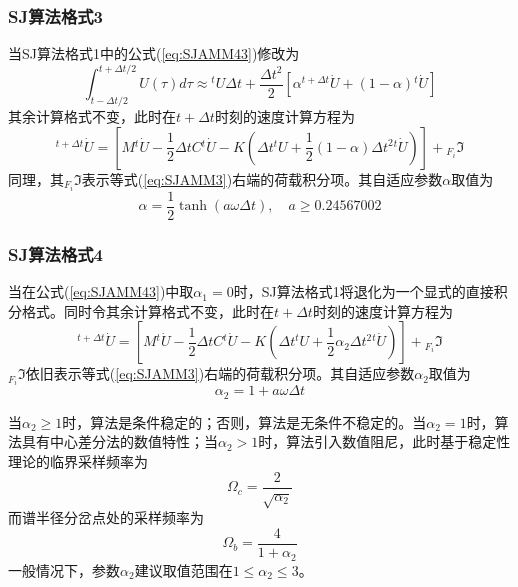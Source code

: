 \subsubsection{SJ算法格式3\cite{SoaresJr2015b}}
当SJ算法格式1\cite{SoaresJr2015c}中的公式(\ref{eq:SJAMM43})修改为
\begin{equation}
\int_{t-\Delta t/2}^{t+\Delta t/2}{U}(\tau)d\tau\approx{^t\!U}\Delta t+\frac{\Delta t^2}{2}[\alpha{^{t+\Delta t}\!\dot{U}}+(1-\alpha){^{t}\!\dot{U}}]
\end{equation}
其余计算格式不变，此时在$t+\Delta t$时刻的速度计算方程为
\begin{equation}
[M+\frac{1}{2}\Delta tC+\frac{1}{2}\alpha\Delta t^2K]{^{t+\Delta t}\!\dot{U}}=[M{^t\!\dot{U}}-\frac{1}{2}\Delta tC{^t\!\dot{U}}-K(\Delta t{^t\!U}+\frac{1}{2}(1-\alpha)\Delta t^2{^t\!\dot{U}})]+{_{F_i}\!\Im}
\end{equation}
同理，其${_{F_i}\!\Im}$表示等式(\ref{eq:SJAMM3})右端的荷载积分项。其自适应参数$\alpha$取值为
\begin{equation}
\alpha=\frac{1}{2}\tanh(a\omega\Delta t),\quad a\ge0.24567002
\end{equation}

\subsubsection{SJ算法格式4\cite{SoaresJr2014e}}
当在公式(\ref{eq:SJAMM43})中取$\alpha_1=0$时，SJ算法格式1\cite{SoaresJr2015c}将退化为一个显式的直接积分格式\cite{SoaresJr2014e}。同时令其余计算格式不变，此时在$t+\Delta t$时刻的速度计算方程为
\begin{equation}
[M+\frac{1}{2}\Delta tC]{^{t+\Delta t}\!\dot{U}}=[M{^t\!\dot{U}}-\frac{1}{2}\Delta tC{^t\!\dot{U}}-K(\Delta t{^t\!U}+\frac{1}{2}\alpha_2\Delta t^2{^t\!\dot{U}})]+{_{F_i}\!\Im}
\end{equation}
${_{F_i}\!\Im}$依旧表示等式(\ref{eq:SJAMM3})右端的荷载积分项。其自适应参数$\alpha_2$取值为
\begin{equation}
\alpha_2=1+a\omega\Delta t
\end{equation}

当$\alpha_2\ge1$时，算法是条件稳定的；否则，算法是无条件不稳定的。当$\alpha_2=1$时，算法具有中心差分法的数值特性；当$\alpha_2>1$时，算法引入数值阻尼，此时基于稳定性理论的临界采样频率为
\begin{equation}
\Omega_c=\frac{2}{\sqrt{\alpha_2}}
\end{equation}
而谱半径分岔点处的采样频率为
\begin{equation}
\Omega_b=\frac{4}{1+\alpha_2}
\end{equation}
一般情况下，参数$\alpha_2$建议取值范围在$1\le\alpha_2\le3$。

